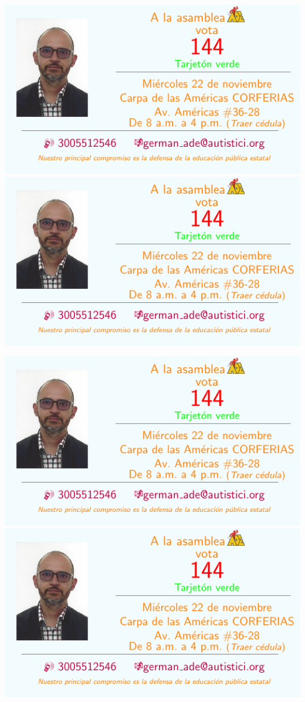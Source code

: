 \documentclass[10pt,letterpaper]{minimal}
\begin{document}
\begin{center}
\hspace{1mm}\includegraphics[scale=1]{Tarjeta.pdf} \includegraphics[scale=1]{Tarjeta.pdf} \vspace{1mm}

\hspace{1mm}\includegraphics[scale=1]{Tarjeta.pdf} \includegraphics[scale=1]{Tarjeta.pdf} \vspace{1mm}


\end{center}
\end{document}
